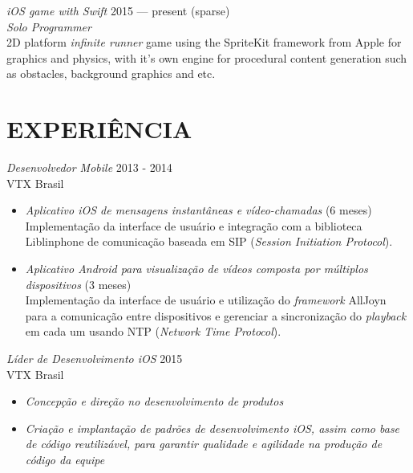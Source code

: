\documentclass[]{res} %
\newcommand{\sbt}{\,\begin{picture}(-1,1)(-2,-3)\circle*{2}\end{picture}\ }
\def \divspace{6pt}
\def \myitemback{0.55cm}
\def \myitemsep{0pt}
\def \mypositionface{\sl}
\def \myprojectface{\it}
\def \myorgface{\sc}
\newif\ifport
\newif\ifgames
\begin{document}
\begin{resume}
    {\myprojectface iOS game with Swift} \hfill 2015 — present (sparse) \\
    {\mypositionface Solo Programmer} \\
    2D platform {\it infinite runner} game using the SpriteKit framework from Apple for graphics and physics, with it's own engine for procedural content generation such as obstacles, background graphics and etc. \ifgames \href{http://mikail.io/ball/}{[link]} \fi
\fi
\ifport
    \section{EXPERIÊNCIA \hspace{\divspace} }

    {\mypositionface Desenvolvedor Mobile} \hfill 2013 - 2014 \\
    {\myorgface VTX Brasil}

    \begin{itemize}[itemsep=\myitemsep,leftmargin=\myitemback]
    \item[\sbt] {\it Aplicativo iOS de mensagens instantâneas e vídeo-chamadas} \hfill (6 meses)\\
    Implementação da interface de usuário e integração com a biblioteca Liblinphone de comunicação baseada em SIP ({\it Session Initiation Protocol}).
    \item[\sbt] {\it Aplicativo Android para visualização de vídeos composta por múltiplos dispositivos} \hfill (3 meses)\\
    Implementação da interface de usuário e utilização do {\it framework} AllJoyn para a comunicação entre dispositivos e gerenciar a sincronização do {\it playback} em cada um usando NTP ({\it Network Time Protocol}).
    \end{itemize}

    {\mypositionface Líder de Desenvolvimento iOS} \hfill 2015\\
    {\myorgface VTX Brasil}

    \begin{itemize}[itemsep=\myitemsep,leftmargin=\myitemback]
    \item[\sbt] {\it Concepção e direção no desenvolvimento de produtos}
    \item[\sbt] {\it Criação e implantação de padrões de desenvolvimento iOS, assim como base de código reutilizável, para garantir qualidade e agilidade na produção de código da equipe}


\end{itemize}
\end{resume}
\end{document}

